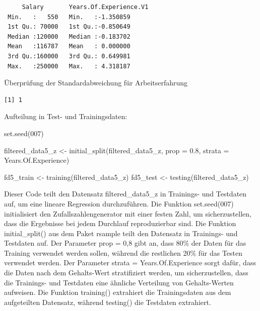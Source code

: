 \documentclass[
  letterpaper,
  DIV=11,
  numbers=noendperiod]{scrartcl}
\newenvironment{Shaded}{\begin{snugshade}}{\end{snugshade}}
\newcommand{\AttributeTok}[1]{\textcolor[rgb]{0.40,0.45,0.13}{#1}}
\newcommand{\DecValTok}[1]{\textcolor[rgb]{0.68,0.00,0.00}{#1}}
\newcommand{\FloatTok}[1]{\textcolor[rgb]{0.68,0.00,0.00}{#1}}
\newcommand{\FunctionTok}[1]{\textcolor[rgb]{0.28,0.35,0.67}{#1}}
\newcommand{\NormalTok}[1]{\textcolor[rgb]{0.00,0.23,0.31}{#1}}
\newcommand{\OtherTok}[1]{\textcolor[rgb]{0.00,0.23,0.31}{#1}}
\newcommand{\SpecialCharTok}[1]{\textcolor[rgb]{0.37,0.37,0.37}{#1}}
\begin{document}
\begin{verbatim}
     Salary       Years.Of.Experience.V1
 Min.   :   550   Min.   :-1.350859     
 1st Qu.: 70000   1st Qu.:-0.850649     
 Median :120000   Median :-0.183702     
 Mean   :116787   Mean   : 0.000000     
 3rd Qu.:160000   3rd Qu.: 0.649981     
 Max.   :250000   Max.   : 4.318187     
\end{verbatim}

Überprüfung der Standardabweichung für Arbeitserfahrung

\begin{Shaded}
\end{Shaded}

\begin{verbatim}
[1] 1
\end{verbatim}

Aufteilung in Test- und Trainingsdaten:

\begin{Shaded}
\begin{Highlighting}[]
\FunctionTok{set.seed}\NormalTok{(}\DecValTok{007}\NormalTok{)}

\NormalTok{filtered\_data5\_z }\OtherTok{\textless{}{-}} \FunctionTok{initial\_split}\NormalTok{(filtered\_data5\_z, }\AttributeTok{prop =} \FloatTok{0.8}\NormalTok{, }\AttributeTok{strata =}\NormalTok{ Years.Of.Experience)}

\NormalTok{fd5\_train }\OtherTok{\textless{}{-}} \FunctionTok{training}\NormalTok{(filtered\_data5\_z)}
\NormalTok{fd5\_test }\OtherTok{\textless{}{-}} \FunctionTok{testing}\NormalTok{(filtered\_data5\_z)}
\end{Highlighting}
\end{Shaded}

Dieser Code teilt den Datensatz filtered\_data5\_z in Trainings- und
Testdaten auf, um eine lineare Regression durchzuführen. Die Funktion
set.seed(007) initialisiert den Zufallszahlengenerator mit einer festen
Zahl, um sicherzustellen, dass die Ergebnisse bei jedem Durchlauf
reproduzierbar sind. Die Funktion initial\_split() aus dem Paket rsample
teilt den Datensatz in Trainings- und Testdaten auf. Der Parameter prop
= 0,8 gibt an, dass 80\% der Daten für das Training verwendet werden
sollen, während die restlichen 20\% für das Testen verwendet werden. Der
Parameter strata = Years.Of.Experience sorgt dafür, dass die Daten nach
dem Gehalts-Wert stratifiziert werden, um sicherzustellen, dass die
Trainings- und Testdaten eine ähnliche Verteilung von Gehalts-Werten
aufweisen. Die Funktion training() extrahiert die Trainingsdaten aus dem
aufgeteilten Datensatz, während testing() die Testdaten extrahiert.
\end{document}
